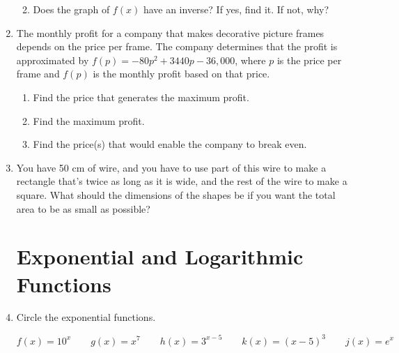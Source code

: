 \documentclass[11pt]{article}
\begin{document}
\begin{enumerate}
\begin{enumerate}
\begin{tikzpicture}[y=.5cm, x=0.5cm,font=\sffamily]
  \end{tikzpicture}


\item Does the graph of $f(x)$ have an inverse?  If yes, find it.  If not, why?
\vfill
\end{enumerate}


\newpage


\item The monthly profit for a company that makes decorative picture frames depends on the price per frame.  The company determines that the profit is approximated by $f(p)=-80p^2+3440p-36,000$, where $p$ is the price per frame and $f(p)$ is the monthly profit based on that price.
\begin{enumerate}
\item Find the price that generates the maximum profit.
\vfill
\item Find the maximum profit.
\vfill
\item Find the price(s) that would enable the company to break even.
\vfill
\end{enumerate}

\item You have 50 cm of wire, and you have to use part of this wire to make a rectangle that's twice as long as it is wide, and the rest of the wire to make a square.  What should the dimensions of the shapes be if you want the total area to be as small as possible?  

\vfill
\vfill
\vfill

\newpage

\section{Exponential and Logarithmic Functions}
\item Circle the exponential functions.

$$f(x)=10^x \quad \quad g(x)=x^7 \quad \quad h(x)=3^{x-5}  \quad \quad k(x)=(x-5)^3 \quad \quad j(x)=e^x$$






\end{enumerate}
\end{document}
